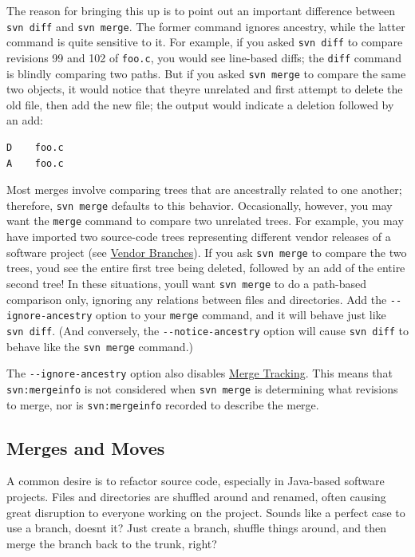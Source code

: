 The reason for bringing this up is to point out an important difference
between \texttt{svn\ diff} and \texttt{svn\ merge}. The former command
ignores ancestry, while the latter command is quite sensitive to it. For
example, if you asked \texttt{svn\ diff} to compare revisions 99 and 102
of \texttt{foo.c}, you would see line-based diffs; the \texttt{diff}
command is blindly comparing two paths. But if you asked
\texttt{svn\ merge} to compare the same two objects, it would notice
that they\textquotesingle re unrelated and first attempt to delete the
old file, then add the new file; the output would indicate a deletion
followed by an add:

\begin{verbatim}
D    foo.c
A    foo.c
\end{verbatim}

Most merges involve comparing trees that are ancestrally related to one
another; therefore, \texttt{svn\ merge} defaults to this behavior.
Occasionally, however, you may want the \texttt{merge} command to
compare two unrelated trees. For example, you may have imported two
source-code trees representing different vendor releases of a software
project (see \hyperref[svn.advanced.vendorbr]{Vendor Branches}). If you
ask \texttt{svn\ merge} to compare the two trees, you\textquotesingle d
see the entire first tree being deleted, followed by an add of the
entire second tree! In these situations, you\textquotesingle ll want
\texttt{svn\ merge} to do a path-based comparison only, ignoring any
relations between files and directories. Add the
\texttt{-\/-ignore-ancestry} option to your \texttt{merge} command, and
it will behave just like \texttt{svn\ diff}. (And conversely, the
\texttt{-\/-notice-ancestry} option will cause \texttt{svn\ diff} to
behave like the \texttt{svn\ merge} command.)

The \texttt{-\/-ignore-ancestry} option also disables
\hyperref[svn.branchmerge.basicmerging.mergetracking]{Merge Tracking}.
This means that \texttt{svn:mergeinfo} is not considered when
\texttt{svn\ merge} is determining what revisions to merge, nor is
\texttt{svn:mergeinfo} recorded to describe the merge.

\subsection{Merges and Moves}\label{svn.branchmerge.advanced.moves}

A common desire is to refactor source code, especially in Java-based
software projects. Files and directories are shuffled around and
renamed, often causing great disruption to everyone working on the
project. Sounds like a perfect case to use a branch,
doesn\textquotesingle t it? Just create a branch, shuffle things around,
and then merge the branch back to the trunk, right?

